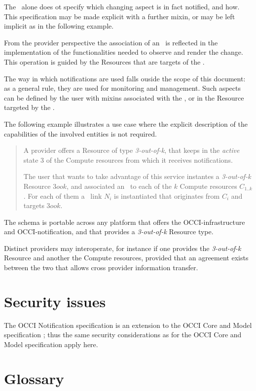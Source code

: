 \documentclass[10pt,a4paper]{article}
\begin{document}
The \smx\ alone does ot specify which changing aspect is in fact notified, and how. This specification may be made explicit with a further mixin, or may be left implicit as in the following example.

From the provider perspective the association of an \smx\ is reflected in the implementation of the functionalities needed to observe and render the change. This operation is guided by the Resources that are targets of the \ntfl.

The way in which notifications are used falls ouside the scope of this document: as a general rule, they are used for monitoring and management. Such aspects can be defined by the user with mixins associated with the \ntfl, or in the Resource targeted by the \ntfl.

The following example illustrates a use case where the explicit description of the capabilities of the involved entities is not required.

\begin{quote}
A provider offers a Resource of type {\em 3-out-of-k}, that keeps in the {\em active} state 3 of the Compute resources from which it receives notifications.

The user that wants to take advantage of this service instantes a {\em 3-out-of-k} Resource $3ook$, and associated an \smx\ to each of the $k$ Compute resources $C_{1..k}$. For each of them a \ntfl\ link $N_i$ is instantiated that originates from $C_i$ and targets $3ook$.
\end{quote}

The schema is portable across any platform that offers the OCCI-infrastructure and OCCI-notification, and that provides a  {\em 3-out-of-k} Resource type.

Distinct providers may interoperate, for instance if one provides the  {\em 3-out-of-k} Resource and another the Compute resources, provided that an agreement exists between the two that allows cross provider information transfer.

\section{Security issues}
The OCCI Notification specification is an extension to the OCCI Core
and Model specification \cite{occi:core}; thus the same security
considerations as for the OCCI Core and Model specification apply
here.

\section{Glossary}
\label{sec:glossary}

 
\end{document}
